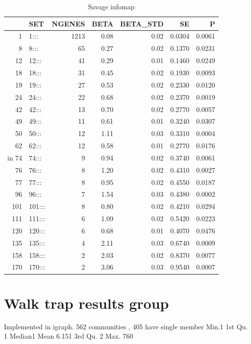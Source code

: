 \begin{table}[ht]
\centering
\begin{tabular}{rlrrrrr}
  \hline
 & SET & NGENES & BETA & BETA\_STD & SE & P \\ 
  \hline
1 & 1::: & 1213 & 0.08 & 0.02 & 0.0304 & 0.0061 \\ 
  8 & 8::: & 65 & 0.27 & 0.02 & 0.1370 & 0.0231 \\ 
  12 & 12::: & 41 & 0.29 & 0.01 & 0.1460 & 0.0249 \\ 
  18 & 18::: & 31 & 0.45 & 0.02 & 0.1930 & 0.0093 \\ 
  19 & 19::: & 27 & 0.53 & 0.02 & 0.2330 & 0.0120 \\ 
  24 & 24::: & 22 & 0.68 & 0.02 & 0.2370 & 0.0019 \\ 
  42 & 42::: & 13 & 0.70 & 0.02 & 0.2770 & 0.0057 \\ 
  49 & 49::: & 11 & 0.61 & 0.01 & 0.3240 & 0.0307 \\ 
  50 & 50::: & 12 & 1.11 & 0.03 & 0.3310 & 0.0004 \\ 
  62 & 62::: & 12 & 0.58 & 0.01 & 0.2770 & 0.0176 \\ in
  74 & 74::: &  9 & 0.94 & 0.02 & 0.3740 & 0.0061 \\ 
  76 & 76::: &  8 & 1.20 & 0.02 & 0.4310 & 0.0027 \\ 
  77 & 77::: &  8 & 0.95 & 0.02 & 0.4550 & 0.0187 \\ 
  96 & 96::: &  7 & 1.54 & 0.03 & 0.4380 & 0.0002 \\ 
  101 & 101::: &  8 & 0.80 & 0.02 & 0.4210 & 0.0294 \\ 
  111 & 111::: &  6 & 1.09 & 0.02 & 0.5420 & 0.0223 \\ 
  120 & 120::: &  6 & 0.68 & 0.01 & 0.4070 & 0.0476 \\ 
  135 & 135::: &  4 & 2.11 & 0.03 & 0.6740 & 0.0009 \\ 
  158 & 158::: &  2 & 2.03 & 0.02 & 0.8370 & 0.0077 \\ 
  170 & 170::: &  2 & 3.06 & 0.03 & 0.9540 & 0.0007 \\ 
   \hline
\end{tabular}
\caption{Savage infomap}
\label{tab:Infomap savage}
\end{table}

\section{Walk trap results group}
\label{sec:walk trap results}
Implemented in igraph. 562 communities , 405 have single member  Min.1 1st Qu.  1 Median1    Mean 6.151 3rd Qu. 2   Max. 760 
 

